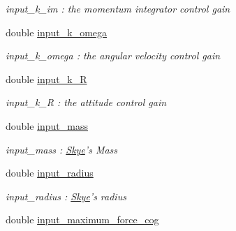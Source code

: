 \begin{DoxyCompactItemize}
\begin{DoxyCompactList}\small\item\em input\-\_\-k\-\_\-im \-: the momentum integrator control gain \end{DoxyCompactList}\item 
\hypertarget{struct_skye_parameters_a49e98c5bf14cc7ac7a7ad8a35b09cbb2}{double \hyperlink{struct_skye_parameters_a49e98c5bf14cc7ac7a7ad8a35b09cbb2}{input\-\_\-k\-\_\-omega}}\label{struct_skye_parameters_a49e98c5bf14cc7ac7a7ad8a35b09cbb2}

\begin{DoxyCompactList}\small\item\em input\-\_\-k\-\_\-omega \-: the angular velocity control gain \end{DoxyCompactList}\item 
\hypertarget{struct_skye_parameters_ad5566192a0f853462ba63e3ebcb0ba8d}{double \hyperlink{struct_skye_parameters_ad5566192a0f853462ba63e3ebcb0ba8d}{input\-\_\-k\-\_\-\-R}}\label{struct_skye_parameters_ad5566192a0f853462ba63e3ebcb0ba8d}

\begin{DoxyCompactList}\small\item\em input\-\_\-k\-\_\-\-R \-: the attitude control gain \end{DoxyCompactList}\item 
\hypertarget{struct_skye_parameters_a2b87d8983628d523ba2c00a0840ef4ff}{double \hyperlink{struct_skye_parameters_a2b87d8983628d523ba2c00a0840ef4ff}{input\-\_\-mass}}\label{struct_skye_parameters_a2b87d8983628d523ba2c00a0840ef4ff}

\begin{DoxyCompactList}\small\item\em input\-\_\-mass \-: \hyperlink{class_skye}{Skye}'s Mass \end{DoxyCompactList}\item 
\hypertarget{struct_skye_parameters_ade9a962c46f28bf506f39a46da67bb80}{double \hyperlink{struct_skye_parameters_ade9a962c46f28bf506f39a46da67bb80}{input\-\_\-radius}}\label{struct_skye_parameters_ade9a962c46f28bf506f39a46da67bb80}

\begin{DoxyCompactList}\small\item\em input\-\_\-radius \-: \hyperlink{class_skye}{Skye}'s radius \end{DoxyCompactList}\item 
\hypertarget{struct_skye_parameters_a0eed3d70a979c9672c9d017178711b14}{double \hyperlink{struct_skye_parameters_a0eed3d70a979c9672c9d017178711b14}{input\-\_\-maximum\-\_\-force\-\_\-cog}}\label{struct_skye_parameters_a0eed3d70a979c9672c9d017178711b14}


\end{DoxyCompactItemize}
